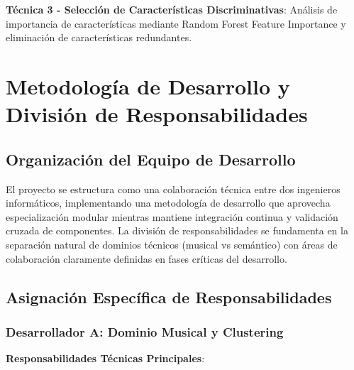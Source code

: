\documentclass[12pt,a4paper]{article}
\begin{document}
\textbf{Técnica 3 - Selección de Características Discriminativas}: Análisis de importancia de características mediante Random Forest Feature Importance y eliminación de características redundantes.



\section{Metodología de Desarrollo y División de Responsabilidades}

\subsection{Organización del Equipo de Desarrollo}

El proyecto se estructura como una colaboración técnica entre dos ingenieros informáticos, implementando una metodología de desarrollo que aprovecha especialización modular mientras mantiene integración continua y validación cruzada de componentes. La división de responsabilidades se fundamenta en la separación natural de dominios técnicos (musical vs semántico) con áreas de colaboración claramente definidas en fases críticas del desarrollo.

\subsection{Asignación Específica de Responsabilidades}

\subsubsection{Desarrollador A: Dominio Musical y Clustering}

\textbf{Responsabilidades Técnicas Principales}:
\end{document}
